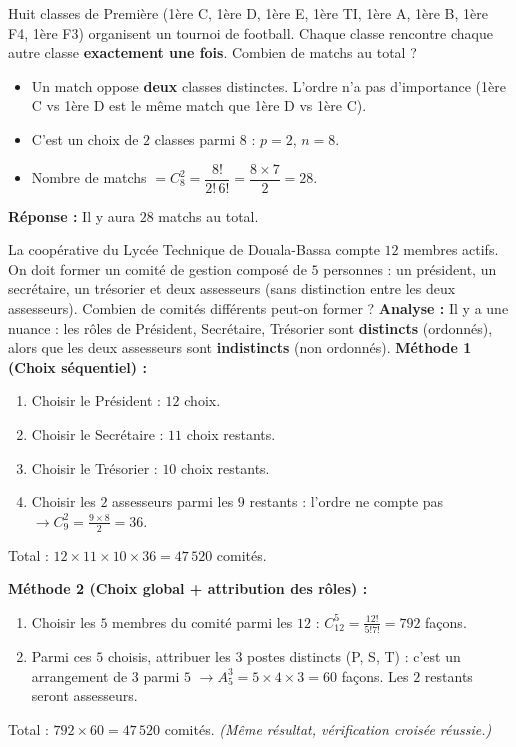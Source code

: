 \documentclass[11pt]{article}
\begin{document}
\begin{exemplebox}
Huit classes de Première (1ère C, 1ère D, 1ère E, 1ère TI, 1ère A, 1ère B, 1ère F4, 1ère F3) organisent un tournoi de football. Chaque classe rencontre chaque autre classe \textbf{exactement une fois}. Combien de matchs au total ?
\begin{itemize}
    \item Un match oppose \textbf{deux} classes distinctes. L'ordre n'a pas d'importance (1ère C vs 1ère D est le même match que 1ère D vs 1ère C).
    \item C'est un choix de $2$ classes parmi $8$ : $p=2$, $n=8$.
    \item Nombre de matchs $= C_8^2 = \dfrac{8!}{2!\,6!} = \dfrac{8 \times 7}{2} = 28$.
\end{itemize}
\textbf{Réponse :} Il y aura $28$ matchs au total.
\end{exemplebox}

\begin{exoresolu}
La coopérative du Lycée Technique de Douala-Bassa compte $12$ membres actifs. On doit former un comité de gestion composé de $5$ personnes : un président, un secrétaire, un trésorier et deux assesseurs (sans distinction entre les deux assesseurs).
Combien de comités différents peut-on former ?
\tcblower
\textbf{Analyse :} Il y a une nuance : les rôles de Président, Secrétaire, Trésorier sont \textbf{distincts} (ordonnés), alors que les deux assesseurs sont \textbf{indistincts} (non ordonnés).
\textbf{Méthode 1 (Choix séquentiel) :}
\begin{enumerate}
    \item Choisir le Président : $12$ choix.
    \item Choisir le Secrétaire : $11$ choix restants.
    \item Choisir le Trésorier : $10$ choix restants.
    \item Choisir les $2$ assesseurs parmi les $9$ restants : l'ordre ne compte pas $\rightarrow C_9^2 = \frac{9\times 8}{2} = 36$.
\end{enumerate}
Total : $12 \times 11 \times 10 \times 36 = 47\,520$ comités.

\textbf{Méthode 2 (Choix global + attribution des rôles) :}
\begin{enumerate}
    \item Choisir les $5$ membres du comité parmi les $12$ : $C_{12}^5 = \frac{12!}{5!7!} = 792$ façons.
    \item Parmi ces $5$ choisis, attribuer les 3 postes distincts (P, S, T) : c'est un arrangement de $3$ parmi $5$ $\rightarrow A_5^3 = 5 \times 4 \times 3 = 60$ façons. Les $2$ restants seront assesseurs.
\end{enumerate}
Total : $792 \times 60 = 47\,520$ comités. \textit{(Même résultat, vérification croisée réussie.)}
\end{exoresolu}
\end{document}
